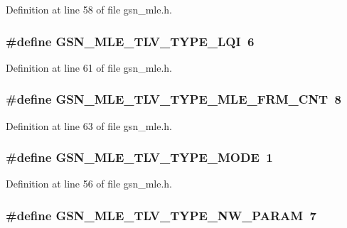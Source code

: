Definition at line 58 of file gsn\_\-mle.h.

\hypertarget{a00527_a8d22cd1a82a36008eea5d5b2e69f845e}{
\subsubsection[{GSN\_\-MLE\_\-TLV\_\-TYPE\_\-LQI}]{\setlength{\rightskip}{0pt plus 5cm}\#define GSN\_\-MLE\_\-TLV\_\-TYPE\_\-LQI~6}}
\label{a00527_a8d22cd1a82a36008eea5d5b2e69f845e}


Definition at line 61 of file gsn\_\-mle.h.

\hypertarget{a00527_a8bc0ba2f61bfaad972d62ee551f839a0}{
\subsubsection[{GSN\_\-MLE\_\-TLV\_\-TYPE\_\-MLE\_\-FRM\_\-CNT}]{\setlength{\rightskip}{0pt plus 5cm}\#define GSN\_\-MLE\_\-TLV\_\-TYPE\_\-MLE\_\-FRM\_\-CNT~8}}
\label{a00527_a8bc0ba2f61bfaad972d62ee551f839a0}


Definition at line 63 of file gsn\_\-mle.h.

\hypertarget{a00527_af299f11b556f92e136368ca99f6c54e2}{
\subsubsection[{GSN\_\-MLE\_\-TLV\_\-TYPE\_\-MODE}]{\setlength{\rightskip}{0pt plus 5cm}\#define GSN\_\-MLE\_\-TLV\_\-TYPE\_\-MODE~1}}
\label{a00527_af299f11b556f92e136368ca99f6c54e2}


Definition at line 56 of file gsn\_\-mle.h.

\hypertarget{a00527_a1b7864a8c86208b30b3ec29d660e9cff}{
\subsubsection[{GSN\_\-MLE\_\-TLV\_\-TYPE\_\-NW\_\-PARAM}]{\setlength{\rightskip}{0pt plus 5cm}\#define GSN\_\-MLE\_\-TLV\_\-TYPE\_\-NW\_\-PARAM~7}}
\label{a00527_a1b7864a8c86208b30b3ec29d660e9cff}



